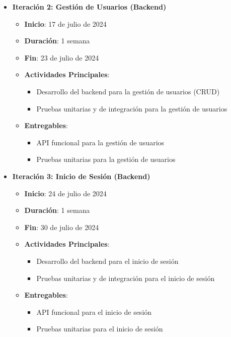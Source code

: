 \documentclass{article}
\begin{document}
\begin{itemize}
\begin{itemize}
              \item \textbf{Iteración 2: Gestión de Usuarios (Backend)}
                    \begin{itemize}
                        \item \textbf{Inicio}: 17 de julio de 2024
                        \item \textbf{Duración}: 1 semana
                        \item \textbf{Fin}: 23 de julio de 2024
                        \item \textbf{Actividades Principales}:
                              \begin{itemize}
                                  \item Desarrollo del backend para la gestión de usuarios (CRUD)
                                  \item Pruebas unitarias y de integración para la gestión de usuarios
                              \end{itemize}
                        \item \textbf{Entregables}:
                              \begin{itemize}
                                  \item API funcional para la gestión de usuarios
                                  \item Pruebas unitarias para la gestión de usuarios
                              \end{itemize}
                    \end{itemize}

              \item \textbf{Iteración 3: Inicio de Sesión (Backend)}
                    \begin{itemize}
                        \item \textbf{Inicio}: 24 de julio de 2024
                        \item \textbf{Duración}: 1 semana
                        \item \textbf{Fin}: 30 de julio de 2024
                        \item \textbf{Actividades Principales}:
                              \begin{itemize}
                                  \item Desarrollo del backend para el inicio de sesión
                                  \item Pruebas unitarias y de integración para el inicio de sesión
                              \end{itemize}
                        \item \textbf{Entregables}:
                              \begin{itemize}
                                  \item API funcional para el inicio de sesión
                                  \item Pruebas unitarias para el inicio de sesión
                              \end{itemize}
                    \end{itemize}


\end{itemize}
\end{itemize}
\end{document}
